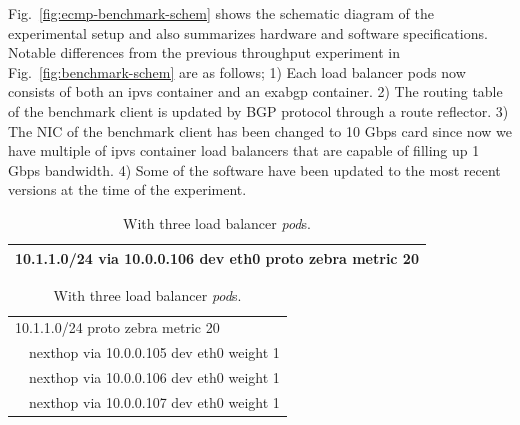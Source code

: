 Fig.~\ref{fig:ecmp-benchmark-schem} shows the schematic diagram of the experimental setup and also summarizes hardware and software specifications.
Notable differences from the previous throughput experiment in Fig.~\ref{fig:benchmark-schem} are as follows;
1) Each load balancer pods now consists of both an ipvs container and an exabgp container.
2) The routing table of the benchmark client is updated by BGP protocol through a route reflector.
3) The NIC of the benchmark client has been changed to 10 Gbps card since now we have multiple of ipvs container load balancers that are capable of filling up 1 Gbps bandwidth.
4) Some of the software have been updated to the most recent versions at the time of the experiment.

\FloatBarrier

{
\setlength{\tabcolsep}{1em}
\renewcommand{\arraystretch}{1.2}

\begin{table}[h]

  \begin{subtable}{.9\textwidth}
    \centering
    \begin{tabular}{l}
    \hline 
    10.1.1.0/24 via 10.0.0.106 dev eth0 proto zebra metric 20 \\
    \hline
    \end{tabular}
    \caption{With single load balancer {\em pod}.}
    \label{tab:single}
  \end{subtable}

  \par\bigskip

\begin{subtable}{.9\textwidth}
  \centering
  \begin{tabular}{ll}
    \hline
    \multicolumn{2}{l}{10.1.1.0/24 proto zebra metric 20 } \\
    \hspace{15 mm}
    & nexthop via 10.0.0.105  dev eth0 weight 1 \\
    & nexthop via 10.0.0.106  dev eth0 weight 1 \\
    & nexthop via 10.0.0.107  dev eth0 weight 1 \\
    \hline
  \end{tabular}
  \caption{With three load balancer {\em pod}s.}
  \label{tab:three}
\end{subtable}

  \par\bigskip


\end{table}}

